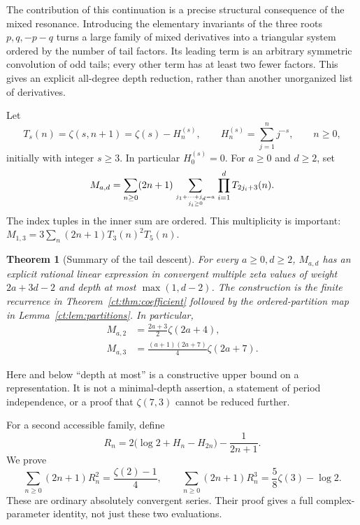 \documentclass[11pt]{article}
\numberwithin{equation}{section}
\newtheorem{theorem}{Theorem}[section]
\theoremstyle{definition}\newtheorem{definition}[theorem]{Definition}
\theoremstyle{remark}\newtheorem{remark}[theorem]{Remark}
\begin{document}
The contribution of this continuation is a precise structural consequence
of the mixed resonance. Introducing the elementary invariants of the
three roots $p,q,-p-q$ turns a large family of mixed derivatives into a
triangular system ordered by the number of tail factors. Its leading
term is an arbitrary symmetric convolution of odd tails; every other term
has at least two fewer factors. This gives an explicit all-degree depth
reduction, rather than another unorganized list of derivatives.

Let
\begin{equation}\label{ct:eq:tails}
 T_s(n)=\zeta(s,n+1)=\zeta(s)-H_n^{(s)},\qquad
 H_n^{(s)}=\sum_{j=1}^n j^{-s},\qquad n\ge0,
\end{equation}
initially with integer $s\ge3$. In particular $H_0^{(s)}=0$.
For $a\ge0$ and $d\ge2$, set
\begin{equation}\label{ct:eq:M}
 M_{a,d}=\sum_{n\ge0}(2n+1)
       \sum_{j_1+\cdots+j_d=a\atop j_i\ge0}
             \prod_{i=1}^d T_{2j_i+3}(n).
\end{equation}
The index tuples in the inner sum are ordered. This multiplicity is
important: $M_{1,3}=3\sum_n(2n+1)T_3(n)^2T_5(n)$.

\begin{theorem}[Summary of the tail descent]\label{ct:thm:summary}
For every $a\ge0,d\ge2$, $M_{a,d}$ has an explicit rational linear
expression in convergent multiple zeta values of weight
$2a+3d-2$ and depth at most $\max(1,d-2)$. The construction is the finite
recurrence in Theorem~\ref{ct:thm:coefficient} followed by the ordered-partition
map in Lemma~\ref{ct:lem:partitions}. In particular,
\begin{align}
 M_{a,2}&=\frac{2a+3}{2}\zeta(2a+4),\label{ct:eq:quadratic}\\
 M_{a,3}&=\frac{(a+1)(2a+7)}4\zeta(2a+7).\label{ct:eq:cubic}
\end{align}
\end{theorem}
Here and below ``depth at most'' is a constructive upper bound on a
representation. It is not a minimal-depth assertion, a statement of period
independence, or a proof that $\zeta(7,3)$ cannot be reduced further.

For a second accessible family, define
\begin{equation}\label{ct:eq:R}
 R_n=2\bigl(\log2+H_n-H_{2n}\bigr)-\frac1{2n+1}.
\end{equation}
We prove
\begin{equation}\label{ct:eq:R-identities}
 \sum_{n\ge0}(2n+1)R_n^2=\frac{\zeta(2)-1}{4},\qquad
 \sum_{n\ge0}(2n+1)R_n^3=\frac58\zeta(3)-\log2.
\end{equation}
These are ordinary absolutely convergent series. Their proof gives a full
complex-parameter identity, not just these two evaluations.
\end{document}
